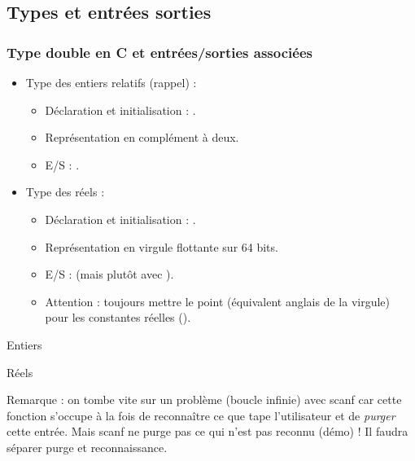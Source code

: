 \documentclass[xcolor=pdftex,svgnames,table]{beamer}
\begin{document}
\subsection[Types char, double et E/S]{Types et entrées sorties}
\begin{frame}
  \frametitle{Type double en C et entrées/sorties associées}
  
  \begin{itemize}
  \item Type des entiers relatifs  \alert{}  (rappel) : 
    \begin{itemize}
    \item Déclaration et initialisation : .
    \item Représentation en complément à deux.
    \item E/S : \alert{}.
    \end{itemize}
  \item Type des réels \alert{} :
    \begin{itemize}
    \item Déclaration et initialisation : .
    \item Représentation en virgule flottante sur 64 bits.
    \item E/S : \alert{} (mais plutôt  avec ).
    \item \alert{Attention :} toujours mettre le point (équivalent
      anglais de la virgule) pour les constantes réelles ().
    \end{itemize}
  \end{itemize}
\end{frame}

\begin{frame}
  \begin{block}{Entiers}
  \end{block}\pause

\begin{block}{Réels}
\end{block}
 Remarque : on tombe vite sur un problème (boucle infinie) avec scanf car cette fonction
 s'occupe à la fois de reconnaître ce que tape l'utilisateur et
 de \emph{purger} cette entrée. Mais scanf ne purge pas ce qui n'est
 pas reconnu (démo) ! Il faudra séparer purge et reconnaissance.
\end{frame}
\end{document}
